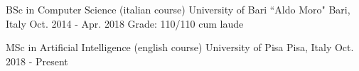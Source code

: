 

\begin{cventries}

  \cventry
    {BSc in Computer Science (italian course)} %
    {University of Bari ``Aldo Moro"} %
    {Bari, Italy} %
    {Oct. 2014 - Apr. 2018} %
    {Grade: 110/110 cum laude}
    
  \cventry
    {MSc in Artificial Intelligence (english course)} %
    {University of Pisa} %
    {Pisa, Italy} %
    {Oct. 2018 - Present} %
    {}

\end{cventries}

